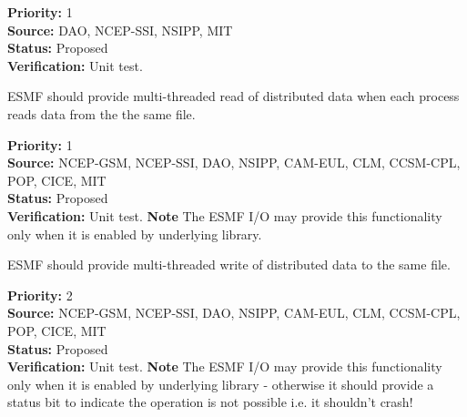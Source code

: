 \begin{reqlist}
{\bf Priority:} 1 \\
{\bf Source:} DAO, NCEP-SSI, NSIPP, MIT \\
{\bf Status:} Proposed \\
{\bf Verification:} Unit test.
\end{reqlist}




ESMF should provide multi-threaded read of distributed data when each
process reads data from the the same file.  

\begin{reqlist}
{\bf Priority:} 1 \\
{\bf Source:} NCEP-GSM, NCEP-SSI, DAO, NSIPP, CAM-EUL, CLM, CCSM-CPL, POP, CICE, MIT \\
{\bf Status:} Proposed \\
{\bf Verification:} Unit test.
{\bf Note} The ESMF I/O may provide this functionality only when it is 
enabled by underlying library. 
\end{reqlist}




ESMF should provide multi-threaded write of distributed data to the same 
file.  

\begin{reqlist}
{\bf Priority:} 2 \\
{\bf Source:} NCEP-GSM, NCEP-SSI, DAO, NSIPP, CAM-EUL, CLM, CCSM-CPL, POP, CICE, MIT \\
{\bf Status:} Proposed \\
{\bf Verification:} Unit test.
{\bf Note} The ESMF I/O may provide this functionality only when it is 
enabled by underlying library - otherwise it should provide a status
bit to indicate the operation is not possible i.e. it shouldn't crash!
\end{reqlist}





